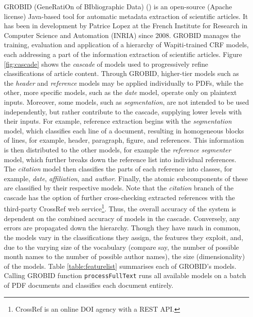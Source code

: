 GROBID (GeneRatiOn of BIbliographic Data) (\cite{lopez2009grobid}) is an open-source (Apache license) Java-based tool for automatic metadata extraction of scientific articles. It has been in development by Patrice Lopez at the French Institute for Research in Computer Science and Automation (INRIA) since 2008. GROBID manages the training, evaluation and application of a hierarchy of Wapiti-trained CRF models, each addressing a part of the information extraction of scientific articles. Figure \ref{fig:cascade} shows the \emph{cascade} of models used to progressively refine classifications of article content. Through GROBID, higher-tier models such as the \emph{header} and \emph{reference} models may be applied individually to PDFs, while the other, more specific models, such as the \emph{date} model, operate only on plaintext inputs. Moreover, some models, such as \emph{segmentation}, are not intended to be used independently, but rather contribute to the cascade, supplying lower levels with their inputs. For example, reference extraction begins with the \emph{segmentation} model, which classifies each line of a document, resulting in homogeneous blocks of lines, for example, header, paragraph, figure, and references. This information is then distributed to the other models, for example the \emph{reference segmenter} model, which further breaks down the reference list into individual references. The \emph{citation} model then classifies the parts of each reference into classes, for example, \emph{date}, \emph{affiliation}, and \emph{author}. Finally, the atomic subcomponents of these are classified by their respective models. Note that the \emph{citation} branch of the cascade has the option of further cross-checking extracted references with the third-party CrossRef web service\footnote{CrossRef is an online DOI agency with a REST API.}. Thus, the overall accuracy of the system is dependent on the combined accuracy of models in the cascade. Conversely, any errors are propagated down the hierarchy. Though they have much in common, the models vary in the classifications they assign, the features they exploit, and, due to the varying size of the vocabulary (compare say, the number of possible month names to the number of possible author names), the size (dimensionality) of the models. Table \ref{table:featurelist} summarises each of GROBID's models. Calling GROBID function \texttt{processFullText} runs all available models on a batch of PDF documents and classifies each document entirely.

